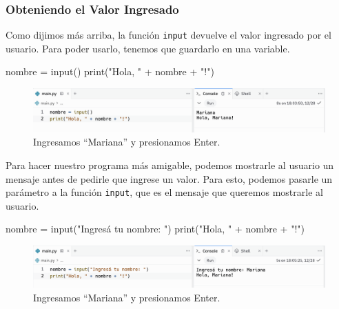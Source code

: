 \documentclass[
  letterpaper,
  DIV=11,
  numbers=noendperiod]{scrreprt}
\newenvironment{Shaded}{\begin{snugshade}}{\end{snugshade}}
\newcommand{\BuiltInTok}[1]{\textcolor[rgb]{0.00,0.23,0.31}{#1}}
\newcommand{\NormalTok}[1]{\textcolor[rgb]{0.00,0.23,0.31}{#1}}
\newcommand{\OperatorTok}[1]{\textcolor[rgb]{0.37,0.37,0.37}{#1}}
\newcommand{\StringTok}[1]{\textcolor[rgb]{0.13,0.47,0.30}{#1}}
\begin{document}
\hypertarget{obteniendo-el-valor-ingresado}{%
\subsubsection{Obteniendo el Valor
Ingresado}\label{obteniendo-el-valor-ingresado}}

Como dijimos más arriba, la función \texttt{input} devuelve el valor
ingresado por el usuario. Para poder usarlo, tenemos que guardarlo en
una variable.

\begin{Shaded}
\begin{Highlighting}[]
\NormalTok{nombre }\OperatorTok{=} \BuiltInTok{input}\NormalTok{()}
\BuiltInTok{print}\NormalTok{(}\StringTok{"Hola, "} \OperatorTok{+}\NormalTok{ nombre }\OperatorTok{+} \StringTok{"!"}\NormalTok{)}
\end{Highlighting}
\end{Shaded}

\begin{figure}

{\centering \includegraphics{./imgs/unidad_2/ejemplo_input1.png}

}

\caption{Ingresamos ``Mariana'' y presionamos Enter.}

\end{figure}

Para hacer nuestro programa más amigable, podemos mostrarle al usuario
un mensaje antes de pedirle que ingrese un valor. Para esto, podemos
pasarle un parámetro a la función \texttt{input}, que es el mensaje que
queremos mostrarle al usuario.

\begin{Shaded}
\begin{Highlighting}[]
\NormalTok{nombre }\OperatorTok{=} \BuiltInTok{input}\NormalTok{(}\StringTok{"Ingresá tu nombre: "}\NormalTok{)}
\BuiltInTok{print}\NormalTok{(}\StringTok{"Hola, "} \OperatorTok{+}\NormalTok{ nombre }\OperatorTok{+} \StringTok{"!"}\NormalTok{)}
\end{Highlighting}
\end{Shaded}

\begin{figure}

{\centering \includegraphics{./imgs/unidad_2/ejemplo_input2.png}

}

\caption{Ingresamos ``Mariana'' y presionamos Enter.}

\end{figure}
\end{document}
